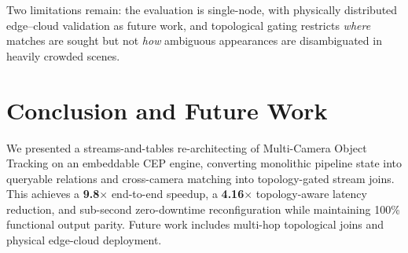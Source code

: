 \documentclass[conference]{IEEEtran}
\begin{document}
Two limitations remain: the evaluation is single-node, with physically distributed edge--cloud validation as future work, and topological gating restricts \emph{where} matches are sought but not \emph{how} ambiguous appearances are disambiguated in heavily crowded scenes.

\section{Conclusion and Future Work}
\label{sec:conclusion}
We presented a streams-and-tables re-architecting of Multi-Camera Object Tracking on an embeddable CEP engine, converting monolithic pipeline state into queryable relations and cross-camera matching into topology-gated stream joins. This achieves a \textbf{9.8$\times$} end-to-end speedup, a \textbf{4.16$\times$} topology-aware latency reduction, and sub-second zero-downtime reconfiguration while maintaining 100\% functional output parity. Future work includes multi-hop topological joins and physical edge-cloud deployment.

{\footnotesize


}
\end{document}
